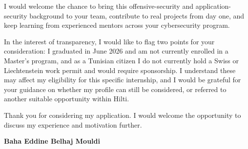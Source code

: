 \documentclass[a4paper,11pt]{article}
\begin{document}
I would welcome the chance to bring this offensive-security and application-security background to your team, contribute to real projects from day one, and keep learning from experienced mentors across your cybersecurity program.

In the interest of transparency, I would like to flag two points for your consideration: I graduated in June 2026 and am not currently enrolled in a Master's program, and as a Tunisian citizen I do not currently hold a Swiss or Liechtenstein work permit and would require sponsorship. I understand these may affect my eligibility for this specific internship, and I would be grateful for your guidance on whether my profile can still be considered, or referred to another suitable opportunity within Hilti.

Thank you for considering my application. I would welcome the opportunity to discuss my experience and motivation further.

\vspace{0.8cm}

\begin{flushright}
{\bfseries Baha Eddine Belhaj Mouldi}
\end{flushright}
\end{document}
